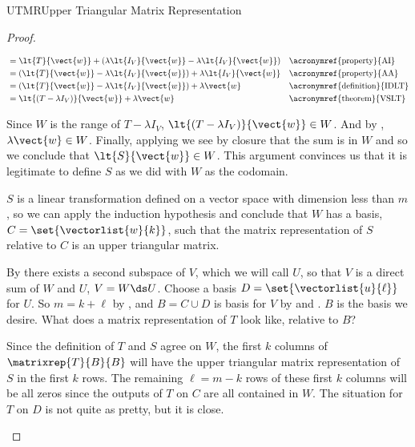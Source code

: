 \begin{subsect}{UTMR}{Upper Triangular Matrix Representation}
\begin{proof}
\begin{para}
\begin{align*}
%
&=\lt{T}{\vect{w}}+\left(\lambda\lt{I_V}{\vect{w}}-\lambda\lt{I_V}{\vect{w}}\right)&&\text{\acronymref{property}{AI}}\\
%
&=\left(\lt{T}{\vect{w}}-\lambda\lt{I_V}{\vect{w}}\right)+\lambda\lt{I_V}{\vect{w}}&&\text{\acronymref{property}{AA}}\\
%
&=\left(\lt{T}{\vect{w}}-\lambda\lt{I_V}{\vect{w}}\right)+\lambda\vect{w}&&\text{\acronymref{definition}{IDLT}}\\
%
&=\lt{\left(T-\lambda I_V\right)}{\vect{w}}+\lambda\vect{w}
&&\text{\acronymref{theorem}{VSLT}}
%
\end{align*}
\end{para}
%
\begin{para}Since $W$ is the range of $T-\lambda I_V$, $\lt{\left(T-\lambda I_V\right)}{\vect{w}}\in W$.  And by , $\lambda\vect{w}\in W$.  Finally, applying  we see by closure that the sum is in $W$ and so we conclude that $\lt{S}{\vect{w}}\in W$.  This argument convinces us that it is legitimate to define $S$ as we did with $W$ as the codomain.\end{para}
%
\begin{para}$S$ is a linear transformation defined on a vector space with dimension less than $m$, so we can apply the induction hypothesis and conclude that $W$ has a basis, $C=\set{\vectorlist{w}{k}}$, such that the matrix representation of $S$ relative to $C$ is an upper triangular matrix.\end{para}
%
\begin{para}By  there exists a second subspace of $V$, which we will call $U$, so that $V$ is a direct sum of $W$ and $U$, $V=W\ds U$.  Choose a basis $D=\set{\vectorlist{u}{\ell}}$ for $U$.  So  $m=k+\ell$ by , and $B=C\cup D$ is basis for $V$ by  and .  $B$ is the basis we desire.  What does a matrix representation of $T$ look like, relative to $B$?\end{para}
%
\begin{para}Since the definition of $T$ and $S$ agree on $W$,  the first $k$ columns of $\matrixrep{T}{B}{B}$ will have the upper triangular matrix representation of $S$ in the first $k$ rows.  The remaining $\ell=m-k$ rows of these first $k$ columns will be all zeros since the outputs of $T$ on $C$ are all contained in $W$.  The situation for $T$ on $D$ is not quite as pretty, but it is close.\end{para}
%

\end{proof}
\end{subsect}
